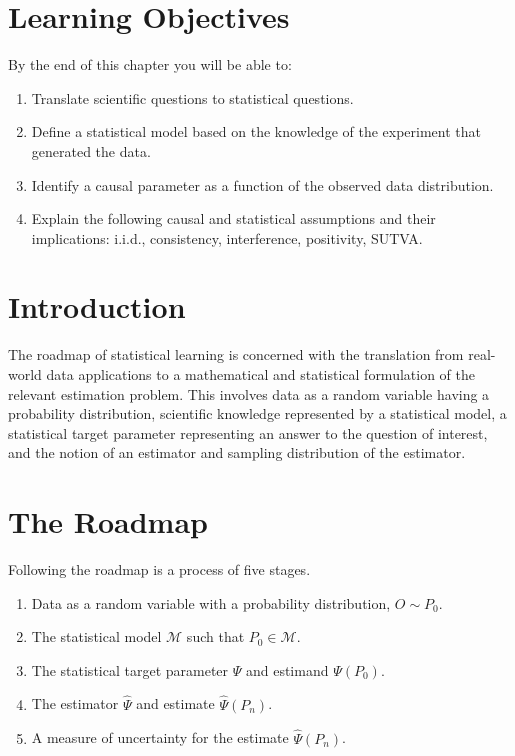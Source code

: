 \documentclass[
  12pt, krantz2,
]{book}
\providecommand{\tightlist}{%
  \setlength{\itemsep}{0pt}\setlength{\parskip}{0pt}}
\theoremstyle{definition}
\theoremstyle{definition}
\theoremstyle{definition}
\newcommand{\1}{\mathbbm{1}}
\begin{document}
\hypertarget{learning-objectives-1}{%
\section{Learning Objectives}\label{learning-objectives-1}}

By the end of this chapter you will be able to:

\begin{enumerate}
\def\labelenumi{\arabic{enumi}.}
\tightlist
\item
  Translate scientific questions to statistical questions.
\item
  Define a statistical model based on the knowledge of the experiment that
  generated the data.
\item
  Identify a causal parameter as a function of the observed data distribution.
\item
  Explain the following causal and statistical assumptions and their
  implications: i.i.d., consistency, interference, positivity, SUTVA.
\end{enumerate}

\hypertarget{introduction}{%
\section{Introduction}\label{introduction}}

The roadmap of statistical learning is concerned with the translation from
real-world data applications to a mathematical and statistical formulation of
the relevant estimation problem. This involves data as a random variable having
a probability distribution, scientific knowledge represented by a statistical
model, a statistical target parameter representing an answer to the question of
interest, and the notion of an estimator and sampling distribution of the
estimator.

\hypertarget{the-roadmap}{%
\section{The Roadmap}\label{the-roadmap}}

Following the roadmap is a process of five stages.

\begin{enumerate}
\def\labelenumi{\arabic{enumi}.}
\tightlist
\item
  Data as a random variable with a probability distribution, \(O \sim P_0\).
\item
  The statistical model \(\mathcal{M}\) such that \(P_0 \in \mathcal{M}\).
\item
  The statistical target parameter \(\Psi\) and estimand \(\Psi(P_0)\).
\item
  The estimator \(\hat{\Psi}\) and estimate \(\hat{\Psi}(P_n)\).
\item
  A measure of uncertainty for the estimate \(\hat{\Psi}(P_n)\).
\end{enumerate}
\end{document}
